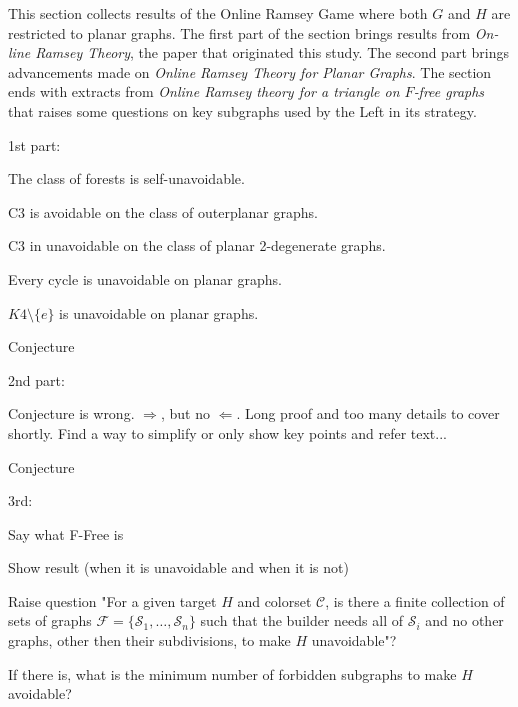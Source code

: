 This section collects results of the Online Ramsey Game where both $G$ and $H$ are restricted to planar graphs. The first part of the section brings results from \textit{On-line Ramsey Theory}, the paper that originated this study. The second part brings advancements made on \textit{Online Ramsey Theory for Planar Graphs}. The section ends with extracts from \textit{Online Ramsey theory for a triangle on $F$‐free graphs} that raises some questions on key subgraphs used by the Left in its strategy.

1st part:

The class of forests is self-unavoidable.

C3 is avoidable on the class of outerplanar graphs.

C3 in unavoidable on the class of planar 2-degenerate graphs.

Every cycle is unavoidable on planar graphs.

$K4\setminus \{e\}$ is unavoidable on planar graphs.

Conjecture 

2nd part:

Conjecture is wrong. $\Rightarrow$, but no $\Leftarrow$. Long proof and too many details to cover shortly. Find a way to simplify or only show key points and refer text...

Conjecture

3rd:

Say what F-Free is

Show result (when it is unavoidable and when it is not)

Raise question "For a given target $H$ and colorset $\mathcal{C}$, is there a finite collection of sets of graphs $\mathcal{F} = \{\mathcal{S}_1, \ldots, \mathcal{S}_n\}$ such that the builder needs all of $\mathcal{S}_i$ and no other graphs, other then their subdivisions, to make $H$ unavoidable"? 

If there is, what is the minimum number of forbidden subgraphs to make $H$ avoidable?